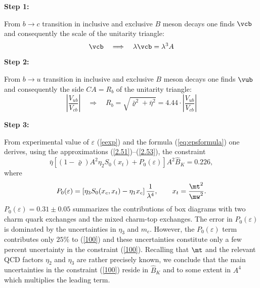 {\bf Step 1:}

{}From  $b\to c$ transition in inclusive and exclusive $B$ meson decays
one finds $\vcb$ and consequently the scale of the unitarity triangle:
\begin{equation}
\vcb\quad \Longrightarrow\quad\lambda \vcb= \lambda^3 A
\end{equation}

{\bf Step 2:}

{}From  $b\to u$ transition in inclusive and exclusive $B$ meson decays
one finds $\vub$ and consequently the side $CA=R_b$ of the unitarity
triangle:
\begin{equation}\label{rb}
\left| \frac{V_{ub}}{V_{cb}} \right|
 \quad\Longrightarrow \quad R_b=\sqrt{\bar\varrho^2+\bar\eta^2}=
4.44 \cdot \left| \frac{V_{ub}}{V_{cb}} \right|
\end{equation}

{\bf Step 3:}

{}From experimental value of $\varepsilon$ (\ref{eexp}) 
and the formula (\ref{eq:epsformula}) one 
derives, using the approximations (\ref{2.51})--(\ref{2.53}), 
the constraint
\begin{equation}\label{100}
\bar\eta \left[(1-\bar\varrho) A^2 \eta_2 S_0(x_t)
+ P_0(\varepsilon) \right] A^2 \hat B_K = 0.226,
\end{equation}
where
\begin{equation}\label{102}
P_0(\varepsilon) = 
\left[ \eta_3 S_0(x_c,x_t) - \eta_1 x_c \right] \frac{1}{\lambda^4},
\qquad
x_t=\frac{\mt^2}{\mw^2}.
\end{equation}
 $P_0(\varepsilon)=0.31\pm0.05$ summarizes the contributions
of box diagrams with two charm quark exchanges and the mixed 
charm-top exchanges. The error in $P_0(\varepsilon)$ is dominated by the
uncertainties in $\eta_3$ and $m_c$.
However, the $P_0(\varepsilon)$
term contributes only $25\%$ to (\ref{100}) and these uncertainties
constitute only  a few percent uncertainty in the constraint
(\ref{100}). 
Recalling that
$\mt$ and the relevant QCD factors $\eta_2$ and $\eta_3$ 
are rather precisely known, we conclude that
the main uncertainties in the constraint (\ref{100}) reside in
$\hat B_K$ and to some extent in $A^4$ which multiplies the leading term.

